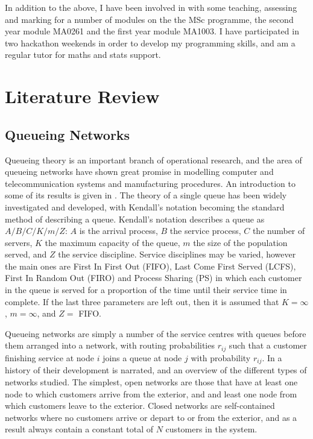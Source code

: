 \documentclass{article}
\begin{document}
In addition to the above, I have been involved in with some teaching, assessing and marking for a number of modules on the the MSc programme, the second year module MA0261 and the first year module MA1003.
I have participated in two hackathon weekends in order to develop my programming skills, and am a regular tutor for maths and stats support.


\section{Literature Review}

\subsection{Queueing Networks}
Queueing theory is an important branch of operational research, and the area of queueing networks have shown great promise in modelling computer and telecommunication systems and manufacturing procedures.
An introduction to some of its results is given in \cite{stewart09}.
The theory of a single queue has been widely investigated and developed, with Kendall's notation becoming the standard method of describing a queue.
Kendall's notation describes a queue as $A/B/C/K/m/Z$: $A$ is the arrival process, $B$ the service process, $C$ the number of servers, $K$ the maximum capacity of the queue, $m$ the size of the population served, and $Z$ the service discipline.
Service disciplines may be varied, however the main ones are First In First Out (FIFO), Last Come First Served (LCFS), First In Random Out (FIRO) and Process Sharing (PS) in which each customer in the queue is served for a proportion of the time until their service time in complete.
If the last three parameters are left out, then it is assumed that $K = \infty$, $m = \infty$, and $Z =$ FIFO.

Queueing networks are simply a number of the service centres with queues before them arranged into a network, with routing probabilities $r_{ij}$ such that a customer finishing service at node $i$ joins a queue at node $j$ with probability $r_{ij}$.
In \cite{rege90} a history of their development is narrated, and an overview of the different types of networks studied.
The simplest, open networks are those that have at least one node to which customers arrive from the exterior, and and least one node from which customers leave to the exterior.
Closed networks are self-contained networks where no customers arrive or depart to or from the exterior, and as a result always contain a constant total of $N$ customers in the system.
\end{document}
